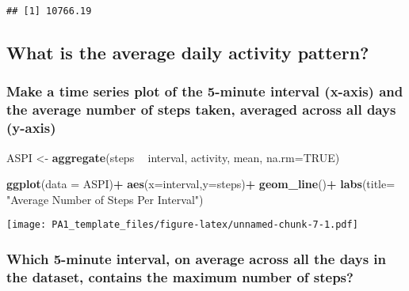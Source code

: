 \documentclass[
]{article}
\newenvironment{Shaded}{\begin{snugshade}}{\end{snugshade}}
\newcommand{\DataTypeTok}[1]{\textcolor[rgb]{0.13,0.29,0.53}{#1}}
\newcommand{\KeywordTok}[1]{\textcolor[rgb]{0.13,0.29,0.53}{\textbf{#1}}}
\newcommand{\NormalTok}[1]{#1}
\newcommand{\OperatorTok}[1]{\textcolor[rgb]{0.81,0.36,0.00}{\textbf{#1}}}
\newcommand{\OtherTok}[1]{\textcolor[rgb]{0.56,0.35,0.01}{#1}}
\newcommand{\StringTok}[1]{\textcolor[rgb]{0.31,0.60,0.02}{#1}}
\begin{document}
\begin{verbatim}
## [1] 10766.19
\end{verbatim}

\hypertarget{what-is-the-average-daily-activity-pattern}{%
\subsection{What is the average daily activity
pattern?}\label{what-is-the-average-daily-activity-pattern}}

\hypertarget{make-a-time-series-plot-of-the-5-minute-interval-x-axis-and-the-average-number-of-steps-taken-averaged-across-all-days-y-axis}{%
\subsubsection{Make a time series plot of the 5-minute interval (x-axis)
and the average number of steps taken, averaged across all days
(y-axis)}\label{make-a-time-series-plot-of-the-5-minute-interval-x-axis-and-the-average-number-of-steps-taken-averaged-across-all-days-y-axis}}

\begin{Shaded}
\begin{Highlighting}[]
\NormalTok{ASPI <-}\StringTok{ }\KeywordTok{aggregate}\NormalTok{(steps }\OperatorTok{~}\StringTok{ }\NormalTok{interval, activity, mean, }\DataTypeTok{na.rm=}\OtherTok{TRUE}\NormalTok{)}
\end{Highlighting}
\end{Shaded}

\begin{Shaded}
\begin{Highlighting}[]
\KeywordTok{ggplot}\NormalTok{(}\DataTypeTok{data =}\NormalTok{ ASPI)}\OperatorTok{+}
\StringTok{  }\KeywordTok{aes}\NormalTok{(}\DataTypeTok{x=}\NormalTok{interval,}\DataTypeTok{y=}\NormalTok{steps)}\OperatorTok{+}
\StringTok{  }\KeywordTok{geom_line}\NormalTok{()}\OperatorTok{+}
\StringTok{  }\KeywordTok{labs}\NormalTok{(}\DataTypeTok{title=} \StringTok{"Average Number of Steps Per Interval"}\NormalTok{)}
\end{Highlighting}
\end{Shaded}

\texttt{[image: PA1\_template\_files/figure-latex/unnamed-chunk-7-1.pdf]}

\hypertarget{which-5-minute-interval-on-average-across-all-the-days-in-the-dataset-contains-the-maximum-number-of-steps}{%
\subsubsection{Which 5-minute interval, on average across all the days
in the dataset, contains the maximum number of
steps?}\label{which-5-minute-interval-on-average-across-all-the-days-in-the-dataset-contains-the-maximum-number-of-steps}}
\end{document}
